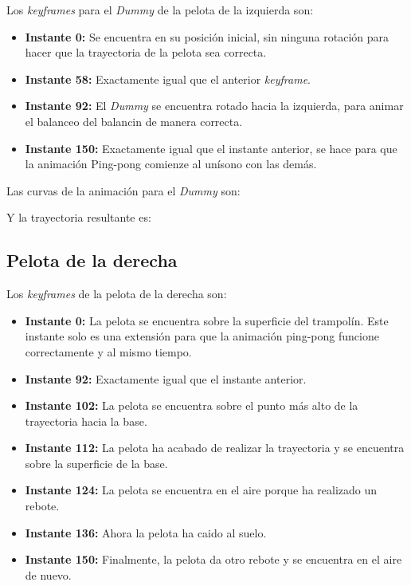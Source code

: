 \documentclass{article}
\begin{document}
Los \textit{keyframes} para el \textit{Dummy} de la pelota de la izquierda son:

\begin{itemize}
    \item \textbf{Instante 0: }Se encuentra en su posición inicial, sin ninguna rotación para hacer que la trayectoria de la pelota sea correcta.
    \item \textbf{Instante 58: }Exactamente igual que el anterior \textit{keyframe}.
    \item \textbf{Instante 92: }El \textit{Dummy} se encuentra rotado hacia la izquierda, para animar el balanceo del balancin de manera correcta.
    \item \textbf{Instante 150: }Exactamente igual que el instante anterior, se hace para que la animación Ping-pong comienze al unísono con las demás.
\end{itemize}

Las curvas de la animación para el \textit{Dummy} son:


Y la trayectoria resultante es:


\subsection{Pelota de la derecha}
Los \textit{keyframes} de la pelota de la derecha son:

\begin{itemize}
    \item \textbf{Instante 0: }La pelota se encuentra sobre la superficie del trampolín. Este instante solo es una extensión para que la animación ping-pong funcione correctamente y al mismo tiempo.
    \item \textbf{Instante 92: }Exactamente igual que el instante anterior.
    \item \textbf{Instante 102: }La pelota se encuentra sobre el punto más alto de la trayectoria hacia la base.
    \item \textbf{Instante 112: }La pelota ha acabado de realizar la trayectoria y se encuentra sobre la superficie de la base.
    \item \textbf{Instante 124: }La pelota se encuentra en el aire porque ha realizado un rebote.
    \item \textbf{Instante 136: }Ahora la pelota ha caido al suelo.
    \item \textbf{Instante 150: }Finalmente, la pelota da otro rebote y se encuentra en el aire de nuevo.
\end{itemize}
\end{document}
